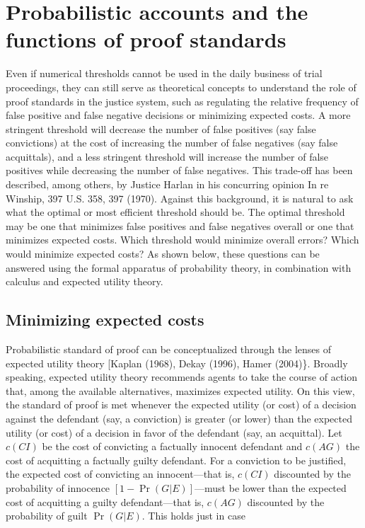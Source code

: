 \documentclass[10pt,dvipsnames]{scrartcl}
\begin{document}
\hypertarget{probabilistic-accounts-and-the-functions-of-proof-standards}{%
\section{Probabilistic accounts and the functions of proof
standards}\label{probabilistic-accounts-and-the-functions-of-proof-standards}}

Even if numerical thresholds cannot be used in the daily business of
trial proceedings, they can still serve as theoretical concepts to
understand the role of proof standards in the justice system, such as
regulating the relative frequency of false positive and false negative
decisions or minimizing expected costs. A more stringent threshold will
decrease the number of false positives (say false convictions) at the
cost of increasing the number of false negatives (say false acquittals),
and a less stringent threshold will increase the number of false
positives while decreasing the number of false negatives. This trade-off
has been described, among others, by Justice Harlan in his concurring
opinion In re Winship, 397 U.S. 358, 397 (1970). Against this
background, it is natural to ask what the optimal or most efficient
threshold should be. The optimal threshold may be one that minimizes
false positives and false negatives overall or one that minimizes
expected costs. Which threshold would minimize overall errors? Which
would minimize expected costs? As shown below, these questions can be
answered using the formal apparatus of probability theory, in
combination with calculus and expected utility theory.

\hypertarget{minimizing-expected-costs}{%
\subsection{Minimizing expected costs}\label{minimizing-expected-costs}}

Probabilistic standard of proof can be conceptualized through the lenses
of expected utility theory {[}Kaplan (1968), Dekay (1996), Hamer
(2004)\}. Broadly speaking, expected utility theory recommends agents to
take the course of action that, among the available alternatives,
maximizes expected utility. On this view, the standard of proof is met
whenever the expected utility (or cost) of a decision against the
defendant (say, a conviction) is greater (or lower) than the expected
utility (or cost) of a decision in favor of the defendant (say, an
acquittal). Let \(c(CI)\) be the cost of convicting a factually innocent
defendant and \(c(AG)\) the cost of acquitting a factually guilty
defendant. For a conviction to be justified, the expected cost of
convicting an innocent---that is, \(c(CI)\) discounted by the
probability of innocence \([1-\Pr(G|E)]\)---must be lower than the
expected cost of acquitting a guilty defendant---that is, \(c(AG)\)
discounted by the probability of guilt \(\Pr(G|E)\). This holds just in
case
\end{document}
